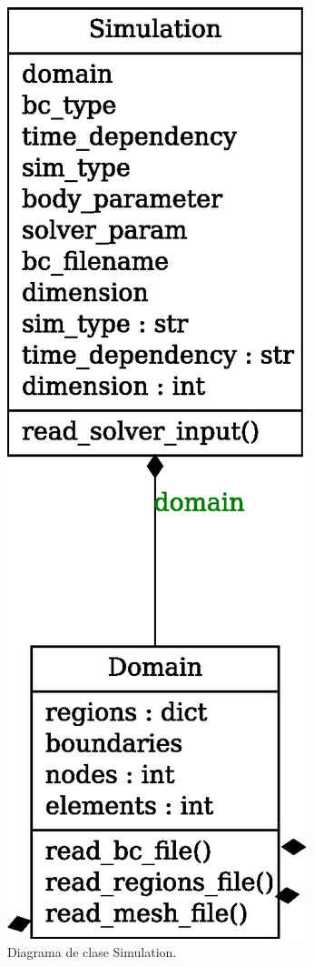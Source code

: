 \documentclass[xcolor=table,serif,handout]{beamer}
\begin{document}
{{\begin{figure}
			\includegraphics[scale=0.35]{classes_reduced_2.eps}
			\caption{Diagrama de clase Simulation.}
			\end{figure}		
		}
		}
\end{document}
